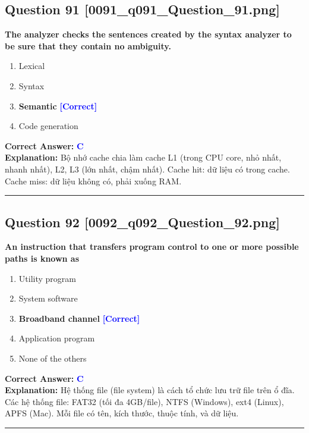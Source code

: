 \documentclass[11pt,a4paper]{article}
\begin{document}
\begin{minipage}{\textwidth}
\subsection*{Question 91 \quad \footnotesize{[0091\_q091\_Question\_91.png]}}
\noindent \textbf{The analyzer checks the sentences created by the syntax analyzer to be sure that they contain no ambiguity.}

\begin{enumerate}[label=\Alph*.]
    \item Lexical
    \item Syntax
    \item \textbf{Semantic} \hfill \textcolor{blue}{\textbf{[Correct]}}
    \item Code generation
\end{enumerate}

\noindent \textbf{Correct Answer:} \textcolor{blue}{\textbf{C}} \\[2pt]
\noindent \textbf{Explanation:} Bộ nhớ cache chia làm cache L1 (trong CPU core, nhỏ nhất, nhanh nhất), L2, L3 (lớn nhất, chậm nhất). Cache hit: dữ liệu có trong cache. Cache miss: dữ liệu không có, phải xuống RAM.

\par\vspace{0.3cm}
\hrule
\vspace{0.3cm}
\end{minipage}

\begin{minipage}{\textwidth}
\subsection*{Question 92 \quad \footnotesize{[0092\_q092\_Question\_92.png]}}
\noindent \textbf{An instruction that transfers program control to one or more possible paths is known as}

\begin{enumerate}[label=\Alph*.]
    \item Utility program
    \item System software
    \item \textbf{Broadband channel} \hfill \textcolor{blue}{\textbf{[Correct]}}
    \item Application program
    \item None of the others
\end{enumerate}

\noindent \textbf{Correct Answer:} \textcolor{blue}{\textbf{C}} \\[2pt]
\noindent \textbf{Explanation:} Hệ thống file (file system) là cách tổ chức lưu trữ file trên ổ đĩa. Các hệ thống file: FAT32 (tối đa 4GB/file), NTFS (Windows), ext4 (Linux), APFS (Mac). Mỗi file có tên, kích thước, thuộc tính, và dữ liệu.

\par\vspace{0.3cm}
\hrule
\vspace{0.3cm}
\end{minipage}
\end{document}
